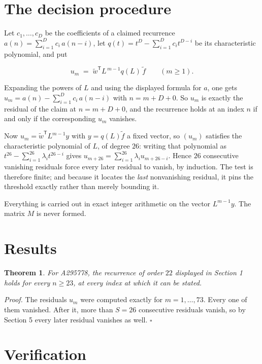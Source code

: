\documentclass[11pt]{article}
\newtheorem{theorem}{Theorem}
\theoremstyle{definition}
\begin{document}
\section{The decision procedure}

Let $c_1,\dots,c_D$ be the coefficients of a claimed recurrence $a(n) = \sum_{i=1}^{D} c_i\,a(n-i)$, let $q(t) = t^{D} - \sum_{i=1}^{D} c_i t^{D-i}$ be its characteristic polynomial, and put

\[u_m \;=\; \tilde w^{\mathsf T} L^{\,m-1} q(L)\,\tilde f \qquad (m \ge 1).\]

Expanding the powers of $L$ and using the displayed formula for $a$, one gets $u_m = a(n) - \sum_{i=1}^{D} c_i\,a(n-i)$ with $n = m + D + 0$. So $u_m$ is exactly the residual of the claim at $n = m + D + 0$, and the recurrence holds at an index $n$ if and only if the corresponding $u_m$ vanishes.

Now $u_m = \tilde w^{\mathsf T} L^{m-1} y$ with $y = q(L)\tilde f$ a fixed vector, so $(u_m)$ satisfies the characteristic polynomial of $L$, of degree $26$: writing that polynomial as $t^{26} - \sum_{i=1}^{26} \lambda_i t^{26-i}$ gives $u_{m+26} = \sum_{i=1}^{26} \lambda_i u_{m+26-i}$. Hence $26$ consecutive vanishing residuals force every later residual to vanish, by induction. The test is therefore finite; and because it locates the {\itshape last} nonvanishing residual, it pins the threshold exactly rather than merely bounding it.

Everything is carried out in exact integer arithmetic on the vector $L^{m-1}y$. The matrix $M$ is never formed.

\section{Results}

\begin{theorem} For A295778, the recurrence of order $22$ displayed in Section 1 holds for every $n \ge 23$, at every index at which it can be stated.\end{theorem}

{\itshape Proof.} The residuals $u_m$ were computed exactly for $m = 1,\dots,73$. Every one of them vanished. After it, more than $S = 26$ consecutive residuals vanish, so by Section 5 every later residual vanishes as well. $\square$

\section{Verification}
\end{document}
